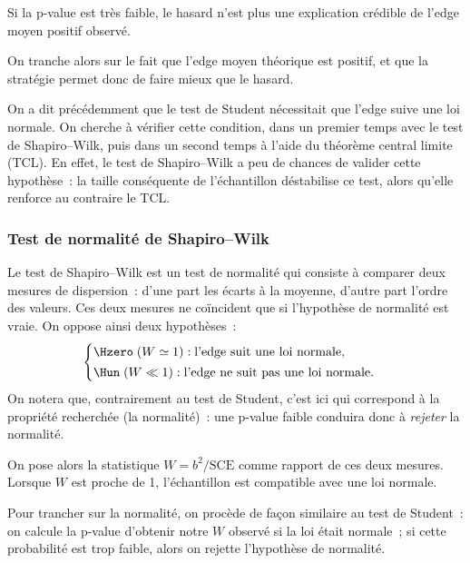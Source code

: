 Si la p-value est très faible, le hasard n'est plus une
explication crédible de l'edge moyen positif observé.

On tranche alors sur le fait que l'edge moyen théorique est positif, et que la
stratégie permet donc de faire mieux que le hasard.


On a dit précédemment que le test de Student nécessitait que l'edge suive
une loi normale. On cherche à vérifier cette condition, dans un premier
temps avec le test de Shapiro--Wilk, puis dans un second temps à l'aide du
théorème central limite (TCL). En effet, le test de Shapiro--Wilk a peu de
chances de valider cette hypothèse~: la taille conséquente de l'échantillon
déstabilise ce test, alors qu'elle renforce au contraire le TCL.

\subsubsection*{Test de normalité de Shapiro--Wilk} %
Le test de Shapiro--Wilk est un test de normalité qui consiste à comparer
deux mesures de dispersion~: d'une part les écarts à la moyenne, d'autre
part l'ordre des valeurs. Ces deux mesures ne coïncident que si
l'hypothèse de normalité est vraie. On oppose ainsi deux hypothèses~:
\[
  \begin{cases}
    \Hzero \;(W \simeq 1) : \text{l'edge suit une loi normale,}\\[2pt]
    \Hun \;(W \ll 1) : \text{l'edge ne suit pas une loi normale.}
  \end{cases}
\]
On notera que, contrairement au test de Student, c'est ici \Hzero{} qui
correspond à la propriété recherchée (la normalité)~: une p-value faible
conduira donc à \emph{rejeter} la normalité.

On pose alors la statistique \(W = b^2 / \mathrm{SCE}\) comme rapport de
ces deux mesures. Lorsque \(W\) est proche de 1, l'échantillon est
compatible avec une loi normale.

Pour trancher sur la normalité, on procède de façon similaire au test de
Student~: on calcule la p-value d'obtenir notre \(W\) observé si la loi
était normale~; si cette probabilité est trop faible, alors on rejette
l'hypothèse de normalité.

